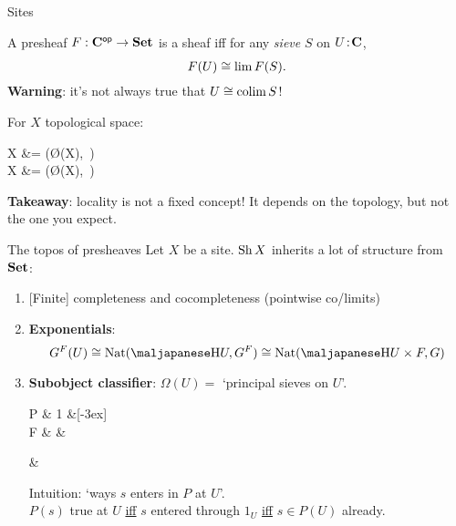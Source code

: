 \begin{frame}{Sites}
	\begin{definition}
		A presheaf $F : \mathbf{C}^{\mathsf{op}} \to \mathbf{Set}$ is a sheaf iff for any \emph{sieve} $S$ on $U \!:\! \mathbf{C}$,
		\begin{equation*}
			F(U) \overset{}{\cong} \lim F(S).
		\end{equation*}
		\textbf{Warning}: it's not always true that $U \overset{}{\cong} \operatorname*{colim} S$!
	\end{definition}

	\begin{example}
		For $X$ topological space:
		\begin{eqalign*}
			\Sh X  &= \Sh (\O(X),\, )\\
			\Psh X &= \Sh (\O(X),\, )
		\end{eqalign*}
	\end{example}
	\textbf{Takeaway}: locality is not a fixed concept! It depends on the topology, but not the one you expect.
\end{frame}

\begin{frame}{The topos of presheaves}
	Let $X$ be a site. $\operatorname{Sh} X$ inherits a lot of structure from $\mathbf{Set}$:
	\begin{enumerate}
		\item<2-> {[Finite]} completeness and cocompleteness (pointwise co/limits)
		\item<3-> \textbf{Exponentials}:
		\begin{equation*}
			G^F(U) \iso \Nat(\yo U, G^F) \iso \Nat(\yo U \times F, G)
		\end{equation*}
		\item<4-> \textbf{Subobject classifier}: $\Omega(U) =$ `principal sieves on $U$'.
		\begin{diagram*}
			P   \& 1  \&[-3ex] \color{colornote}{*} \\
			F  \& \Omega \& \color{colornote}{1_U}
		\end{diagram*}
		\begin{diagram*}
			\phantom{XXX} \color{colornote}{s \in F(U)}  \& \color{colornote}{\{ V \nto{f} U \suchthat s\vert_f \in P(V) \}}
		\end{diagram*}%
		Intuition: `ways $s$ enters in $P$ at $U$'.\\
		$P(s)$ true at $U$ \underline{iff} $s$ entered through $1_U$ \underline{iff} $s \in P(U)$ already.
	\end{enumerate}
\end{frame}

